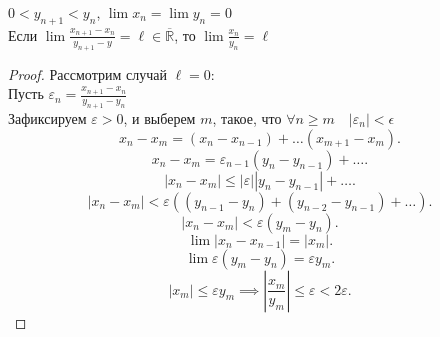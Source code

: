 \documentclass[11pt, oneside]{article}   	%
\begin{document}
    \begin{theorem}
         $0 < y_{n+1} < y_n$, $\lim x_n = \lim y_n = 0$\\
         Если $\lim \frac{x_{n+1}-x_n}{y_{n+1}-y} = \ell\in \overline{\mathbb{R}}$, то $\lim \frac{x_n}{y_n} = \ell$\\
         \begin{proof}
            Рассмотрим случай $\ell = 0$:\\
            Пусть $\varepsilon_n = \frac{x_{n+1}-x_n}{y_{n+1}-y_n}$ \\
            Зафиксируем $\varepsilon > 0$, и выберем  $m$, такое, что  $\forall{n\ge m}\quad |\varepsilon_n| < \epsilon$\\
            \[ x_n - x_m = (x_n-x_{n-1}) + \ldots (x_{m+1}-x_m) .\]
            \[ x_n - x_m = \varepsilon_{n-1}(y_n-y_{n-1}) + \ldots .\]
            \[ |x_n - x_m| \le |\varepsilon| |y_n-y_{n-1}| + \ldots  .\]
            \[ |x_n-x_m| < \varepsilon\left( (y_{n-1}-y_n) + (y_{n-2}-y_{n-1}) + \ldots \right)  .\]
            \[ |x_n - x_m| < \varepsilon\left( y_m-y_n \right)  .\]
            \[ \lim |x_n-x_{n-1}| = |x_m| .\]
            \[ \lim \varepsilon(y_m-y_n) = \varepsilon y_m .\]
            \[ |x_m| \le \varepsilon y_m \implies \left|\frac{x_m}{y_m}\right| \le \varepsilon < 2\varepsilon .\] 
         \end{proof}
    \end{theorem}
\end{document}
